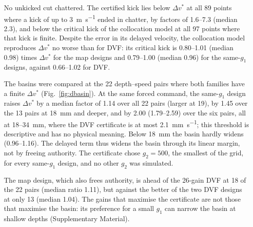 No unkicked cut chattered. The certified kick lies below $\Delta v^*$ at all 89 points where a kick of up to \SI{3}{\metre\per\second} ended in chatter, by factors of 1.6--7.3 (median 2.3), and below the critical kick of the collocation model at all 97 points where that kick is finite. Despite the error in its delayed velocity, the collocation model reproduces $\Delta v^*$ no worse than for DVF: its critical kick is 0.80--1.01 (median 0.98) times $\Delta v^*$ for the map designs and 0.79--1.00 (median 0.96) for the same-$g_1$ designs, against 0.66--1.02 for DVF.

The basins were compared at the 22 depth--speed pairs where both families have a finite $\Delta v^*$ (Fig.~\ref{fig:dbasin}). At the same forced command, the same-$g_1$ design raises $\Delta v^*$ by a median factor of 1.14 over all 22 pairs (larger at 19), by 1.45 over the 13 pairs at \SI{18}{\milli\metre} and deeper, and by 2.00 (1.79--2.59) over the six pairs, all at 18--\SI{34}{\milli\metre}, where the DVF certificate is at most \SI{2.1}{\milli\metre\per\second}; this threshold is descriptive and has no physical meaning. Below \SI{18}{\milli\metre} the basin hardly widens (0.96--1.16). The delayed term thus widens the basin through its linear margin, not by freeing authority. The certificate chose $g_2=500$, the smallest of the grid, for every same-$g_1$ design, and no other $g_2$ was simulated.

The map design, which also frees authority, is ahead of the 26-gain DVF at 18 of the 22 pairs (median ratio 1.11), but against the better of the two DVF designs at only 13 (median 1.04). The gains that maximise the certificate are not those that maximise the basin: its preference for a small $g_1$ can narrow the basin at shallow depths (Supplementary Material).

